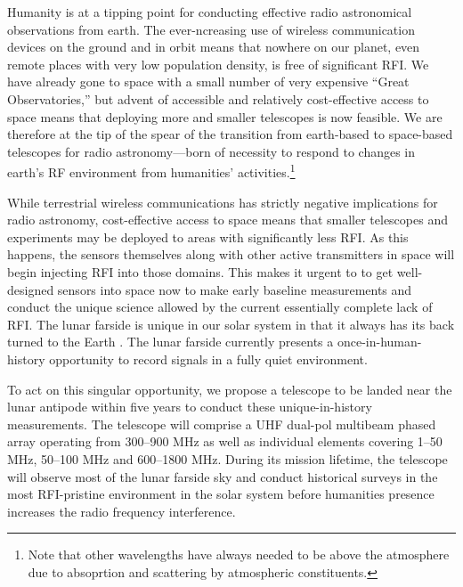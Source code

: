 Humanity is at a tipping point for conducting effective radio astronomical observations from earth. The ever-ncreasing use of wireless communication devices on the ground and in orbit means that nowhere on our planet, even  remote places with very low population density, is free of significant RFI. We have already gone to space with a small number of very expensive “Great Observatories,” but advent of accessible and relatively cost-effective access to space means that deploying more and smaller telescopes is now feasible. We are therefore at the tip of the spear of the transition from earth-based to space-based telescopes for radio astronomy---born of necessity to respond to changes in earth’s RF environment from humanities' activities.\footnote{Note that other wavelengths have always needed to be above the atmosphere due to absoprtion and scattering by atmospheric constituents.}  

While terrestrial wireless communications has strictly negative implications for radio astronomy, cost-effective access to space means that smaller telescopes and experiments may be deployed to areas with significantly less RFI. As this happens, the sensors themselves along with other active transmitters in space will begin injecting RFI into those domains. This makes it urgent to to get well-designed sensors into space now to make early baseline measurements and conduct the unique science allowed by the current essentially complete lack of RFI. The lunar farside is unique in our solar system in that it always has its back turned to the Earth \citep{heidmann2002,MACCONE2019233,michaud2020lunar}. The lunar farside currently presents a once-in-human-history opportunity to record signals in a fully quiet environment. 

To act on this singular opportunity, we propose a telescope to be landed near the lunar antipode within five years to conduct these unique-in-history measurements.  The telescope will comprise a UHF dual-pol multibeam phased array operating from 300--900 MHz as well as individual elements covering 1--50 MHz, 50--100 MHz and 600--1800 MHz.  During its mission lifetime, the telescope will observe most of the lunar farside sky and conduct historical surveys in the most RFI-pristine environment in the solar system before humanities presence increases the radio frequency interference.